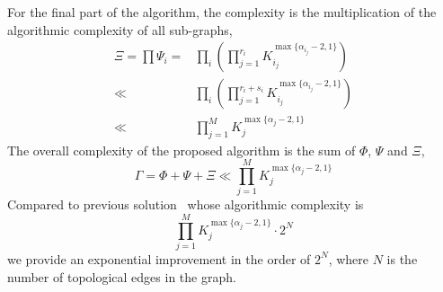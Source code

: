 \documentclass[conference]{IEEEtran}
\begin{document}
For the final part of the algorithm, the complexity is the multiplication of the algorithmic complexity of all sub-graphs, 
\begin{equation}
\begin{aligned}
\Xi = \prod \Psi_i = & \prod\limits_i \left(\prod\limits_{j = 1}^{r_i} K_{i_j}^{\max\{\alpha_{i_j}-2, 1\}}\right)\\
\ll&  \prod\limits_i \left(\prod\limits_{j = 1}^{r_i+s_i} K_{i_j}^{\max\{\alpha_{i_j}-2, 1\}}\right)\\
\ll& \prod\limits_{j = 1}^M K_j^{\max\{\alpha_j-2, 1\}}
\end{aligned}
\end{equation}
The overall complexity of the proposed algorithm is the sum of $\Phi$, $\Psi$ and $\Xi$, 
\begin{equation}
\Gamma =\Phi+\Psi+\Xi \ll  \prod\limits_{j = 1}^M K_j^{\max\{\alpha_j-2, 1\}}
\end{equation}
Compared to previous solution~\cite{Yang2020Cellular} whose algorithmic complexity is
\begin{equation}
\prod\limits_{j = 1}^M K_j^{\max\{\alpha_j-2, 1\}}\cdot 2^N
\end{equation}
we provide an exponential improvement in the order of $2^N$, where $N$ is the number of topological edges in the graph. 

\end{document}
